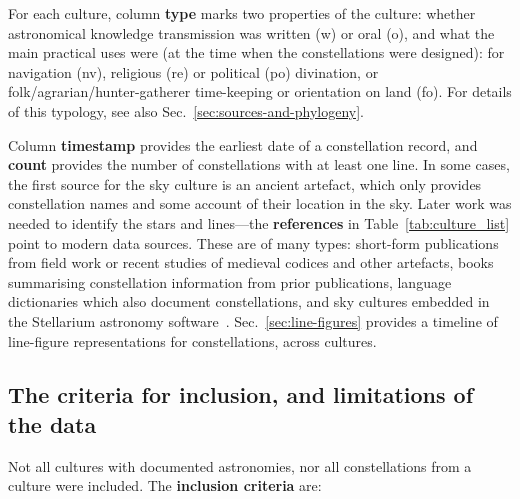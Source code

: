\documentclass[10pt]{article}
\begin{document}
For each culture, column {\bf type} marks two properties of the culture: whether astronomical knowledge transmission was written (w) or oral (o), and what the main practical uses were (at the time when the constellations were designed): for navigation (nv), religious (re) or political (po) divination, or folk/agrarian/hunter-gatherer time-keeping or orientation on land (fo). For details of this typology, see also Sec.~\ref{sec:sources-and-phylogeny}.

Column {\bf timestamp} provides the earliest date of a constellation record, and {\bf count} provides the number of constellations with at least one line. In some cases, the first source for the sky culture is an ancient artefact, which only provides constellation names and some account of their location in the sky. Later work was needed to identify the stars and lines---the {\bf references} in Table~\ref{tab:culture_list} point to modern data sources. These are of many types: short-form publications from field work or recent studies of medieval codices and other artefacts, books summarising constellation information from prior publications, language dictionaries which also document constellations, and sky cultures embedded in the Stellarium astronomy software~\cite{Stellarium}. Sec.~\ref{sec:line-figures} provides a timeline of line-figure representations for constellations, across cultures.


\subsection{The criteria for inclusion, and limitations of the data} 

Not all cultures with documented astronomies, nor all constellations from a culture were included. The {\bf inclusion criteria} are:
\end{document}
